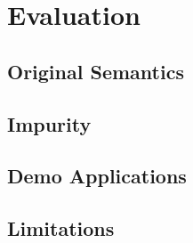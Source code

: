 \chapter{Evaluation}

  \section{Original Semantics}
  
  \section{Impurity}
  
  \section{Demo Applications}
  
  \section{Limitations}